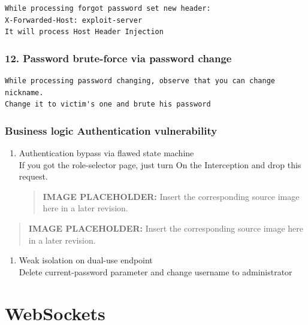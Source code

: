\documentclass[
  letterpaper,
]{article}
\providecommand{\tightlist}{%
  \setlength{\itemsep}{0pt}\setlength{\parskip}{0pt}}
\begin{document}
\begin{Verbatim}[breaklines,breakanywhere,fontsize=\small]
While processing forgot password set new header:
X-Forwarded-Host: exploit-server 
It will process Host Header Injection
\end{Verbatim}

\subsubsection{12. Password brute-force via password
change}\label{12-password-brute-force-via-password-change}

\begin{Verbatim}[breaklines,breakanywhere,fontsize=\small]
While processing password changing, observe that you can change nickname.
Change it to victim's one and brute his password
\end{Verbatim}

\subsubsection{Business logic Authentication
vulnerability}\label{business-logic-authentication-vulnerability}

\begin{enumerate}
\def\labelenumi{\arabic{enumi}.}
\tightlist
\item
  Authentication bypass via flawed state machine\\
  If you got the role-selector page, just turn On the Interception and
  drop this request.\\
\begin{quote}
\textbf{IMAGE PLACEHOLDER:} Insert the corresponding source image here in a later revision.
\end{quote}
\end{enumerate}

\begin{quote}
\textbf{IMAGE PLACEHOLDER:} Insert the corresponding source image here in a later revision.
\end{quote}
\begin{enumerate}
\def\labelenumi{\arabic{enumi}.}
\setcounter{enumi}{1}
\tightlist
\item
  Weak isolation on dual-use endpoint\\
  Delete current-password parameter and change username to administrator
\end{enumerate}

\section{WebSockets}\label{websockets}
\end{document}
